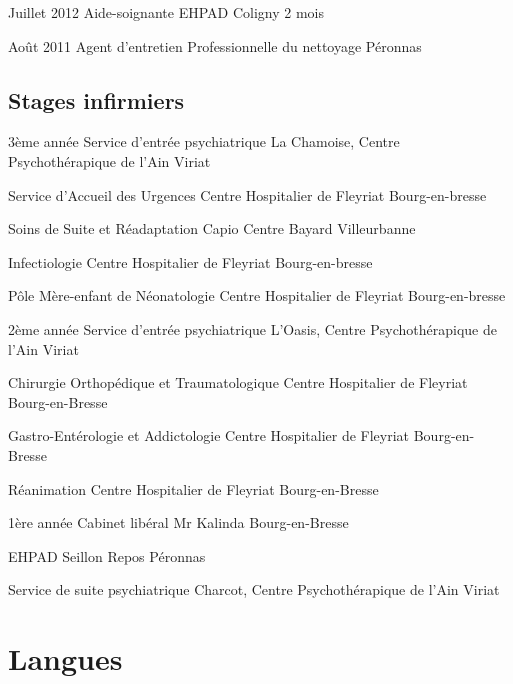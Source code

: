 \documentclass[10pt,a4paper]{moderncv}
\begin{document}
\cventry
    {Juillet 2012}
	{Aide-soignante}
	{EHPAD}
	{Coligny}
	{}
	{2 mois}

\cventry
	{Août 2011}
	{Agent d'entretien}
	{Professionnelle du nettoyage}
	{Péronnas}
	{}
	{}

\subsection{Stages infirmiers}
	
\cventry
	{3ème année}
	{Service d'entrée psychiatrique}
	{La Chamoise, Centre Psychothérapique de l’Ain}
	{Viriat}
	{}
	{}

\cventry
	{}
	{Service d’Accueil des Urgences}
	{Centre Hospitalier de Fleyriat}
	{Bourg-en-bresse}
	{}
	{}

\cventry
	{}
	{Soins de Suite et Réadaptation}
	{Capio Centre Bayard}
	{Villeurbanne}
	{}
	{}

\cventry
	{}
	{Infectiologie}
	{Centre Hospitalier de Fleyriat}
	{Bourg-en-bresse}
	{}
	{}

\cventry
	{}
	{Pôle Mère-enfant de Néonatologie}
	{Centre Hospitalier de Fleyriat}
	{Bourg-en-bresse}
	{}
	{}

\cventry
	{2ème année}
	{Service d’entrée psychiatrique}
	{L'Oasis, Centre Psychothérapique de l’Ain}
	{Viriat}
	{}
	{}

\cventry
	{}
	{Chirurgie Orthopédique et Traumatologique}
	{Centre Hospitalier de Fleyriat}
	{Bourg-en-Bresse}
	{}
	{}

\cventry
	{}
	{Gastro-Entérologie et Addictologie}
    {Centre Hospitalier de Fleyriat}
	{Bourg-en-Bresse}
	{}
	{}

\cventry
	{}
	{Réanimation}
	{Centre Hospitalier de Fleyriat}
	{Bourg-en-Bresse}
	{}
	{}

\cventry
	{1ère année}
	{Cabinet libéral}
	{Mr Kalinda}
	{Bourg-en-Bresse}
	{}
	{}

\cventry
	{}
	{EHPAD}
	{Seillon Repos}
	{Péronnas}
	{}
	{}

\cventry
	{}
	{Service de suite psychiatrique}
	{Charcot, Centre Psychothérapique de l’Ain}
	{Viriat}
	{}
	{}



\section{Langues}
\end{document}
